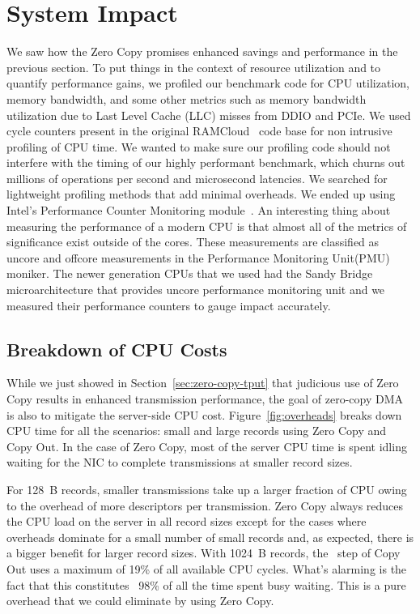 \section{System Impact}
\label{sec:impact}

We saw how the Zero Copy promises enhanced savings and performance 
in the previous section. To put things in the context of resource utilization and
 to quantify performance gains, we profiled our benchmark code for CPU utilization, memory bandwidth, 
 and some other metrics such as memory bandwidth utilization due to Last Level Cache (LLC) misses from DDIO and PCIe.
We used cycle counters present in the original RAMCloud~\cite{ramcloud} code base for non intrusive profiling 
of CPU time. We wanted to make sure our profiling code should not interfere with the timing of our highly performant 
 benchmark, which churns out millions of operations per second and microsecond latencies. 
 We searched for lightweight profiling methods that add minimal overheads.
 We ended up using Intel\textregistered's Performance Counter Monitoring module~\cite{intelpcm}. 
 An interesting thing about measuring the performance 
 of a modern CPU is that almost all of the metrics of significance exist outside of the cores. These measurements 
 are classified as uncore and offcore measurements in the Performance Monitoring Unit(PMU) moniker.
 The newer generation CPUs that we used had the Sandy Bridge microarchitecture that provides uncore performance 
 monitoring unit and we measured their performance counters to gauge impact accurately.


\subsection{Breakdown of CPU Costs}
\label{sec:overhead}

While we just showed in Section~\ref{sec:zero-copy-tput} that judicious use of Zero Copy results 
in enhanced transmission performance, the goal of zero-copy DMA is also to 
mitigate the server-side CPU cost. Figure~\ref{fig:overheads} breaks down CPU time for 
all the scenarios: small and large records using Zero Copy and Copy Out. In the case 
of Zero Copy, most of the server CPU time is spent idling waiting for the NIC 
to complete transmissions at smaller record sizes.

 For 128~B records, smaller transmissions take up a larger fraction of CPU owing to the overhead of more descriptors
per transmission. Zero Copy always reduces the CPU load on the server in all record sizes except for the cases where
overheads dominate for a small number of small records and, as expected, there is a bigger
benefit for larger record sizes. With 1024~B records, the \memcpy ~step of Copy Out uses a maximum of 19\% of all available
CPU cycles. What's alarming is the fact that this constitutes ~98\% of all the time spent busy waiting.
This is a pure overhead that we could eliminate by using Zero Copy.

